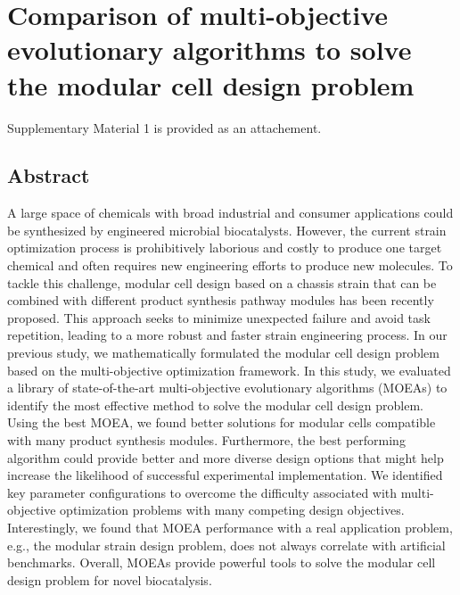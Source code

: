 \chapter{Comparison of multi-objective evolutionary algorithms to solve the modular cell design problem} \label{ch:moea}

\newcommand\HV{\mathit{HV}}
\newcommand\GD{\mathit{GD}}
\newcommand\IGD{\mathit{IGD}}

Supplementary Material 1 is provided as an attachement.


\section*{Abstract}
A large space of chemicals with broad industrial and consumer applications could be synthesized by engineered microbial biocatalysts. However, the current strain optimization process is prohibitively laborious and costly to produce one target chemical and often requires new engineering efforts to produce new molecules. To tackle this challenge, modular cell design based on a chassis strain that can be combined with different product synthesis pathway modules has been recently proposed.
This approach seeks to minimize unexpected failure and avoid task repetition, leading to a more robust and faster strain engineering process. In our previous study, we mathematically formulated
the modular cell design problem based on the multi-objective optimization framework. In this study, we evaluated a library of state-of-the-art multi-objective evolutionary algorithms (MOEAs) to identify the most effective method to solve the modular cell design problem.
Using the best MOEA, we found better solutions for modular cells compatible with many product synthesis modules. Furthermore, the best performing algorithm could provide better and more diverse design options that might help increase the likelihood of successful experimental implementation.
We identified key parameter configurations to overcome the difficulty associated with multi-objective optimization problems with many competing design objectives.
Interestingly, we found that MOEA performance with a real application problem, e.g., the modular strain design problem, does not always correlate with artificial benchmarks. Overall, MOEAs provide powerful tools to solve the modular cell design problem for novel biocatalysis.
